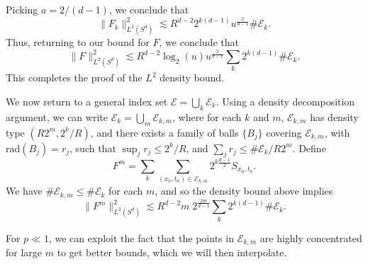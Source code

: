 %
Picking $a = 2 / (d-1)$, we conclude that
%
\[ \| F_k \|_{L^2(S^d)}^2 \lesssim R^{d-2} 2^{k(d-1)} u^{\frac{2}{d-1}} \# \mathcal{E}_k. \]
%
Thus, returning to our bound for $F$, we conclude that
%
\[ \| F \|_{L^2(S^d)}^2 \lesssim R^{d-2} \log_2(u) u^{\frac{2}{d-1}} \sum_k  2^{k(d-1)} \# \mathcal{E}_k. \]  
%
This completes the proof of the $L^2$ density bound.

We now return to a general index set $\mathcal{E} = \bigcup_k \mathcal{E}_k$. Using a density decomposition argument, we can write $\mathcal{E}_k = \bigcup_m \mathcal{E}_{k,m}$, where for each $k$ and $m$, $\mathcal{E}_{k,m}$ has density type $(R2^m, 2^k / R )$, and there exists a family of balls $\{ B_j \}$ covering $\mathcal{E}_{k,m}$, with $\text{rad}(B_j) = r_j$, such that $\sup_j r_j \leq 2^k / R$, and $\sum_j r_j \leq \# \mathcal{E}_k / R 2^m$. Define
%
\[ F^m = \sum_k \sum_{(x_0,t_0) \in \mathcal{E}_{k,m}} 2^{k \frac{d-1}{2}} {S\!}_{x_0,t_0}. \]
%
We have $\# \mathcal{E}_{k,m} \leq \# \mathcal{E}_k$ for each $m$, and so the density bound above implies
%
\[ \| F^m \|_{L^2(S^d)}^2 \lesssim R^{d-2} m\; 2^{\frac{2m}{d-1}} \sum_k 2^{k(d-1)} \# \mathcal{E}_k. \]
%
%
% 

For $p \ll 1$, we can exploit the fact that the points in $\mathcal{E}_{k,m}$ are highly concentrated for large $m$ to get better bounds, which we will then interpolate.

